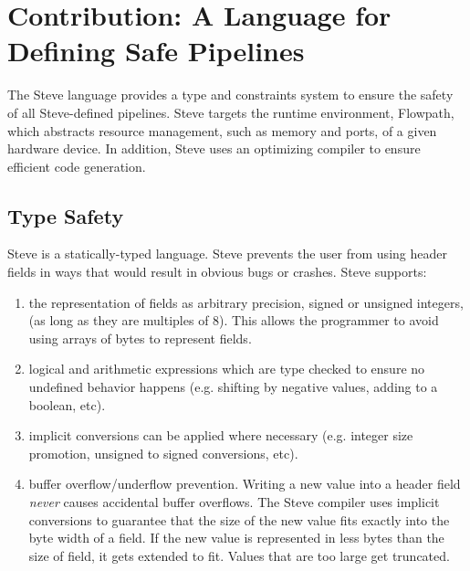\section{Contribution: A Language for Defining Safe Pipelines}

The Steve language provides a type and constraints system to ensure the safety
of all Steve-defined pipelines.
Steve targets the runtime environment, Flowpath, which abstracts resource management,
such as memory and ports, of a given hardware device.
In addition, Steve uses an optimizing compiler to ensure efficient code generation.

\subsection{Type Safety}

Steve is a statically-typed language. Steve prevents the user from using header
fields in ways that would result in obvious bugs or crashes. Steve supports:

\begin{enumerate}
\item the representation of fields as
arbitrary precision, signed or unsigned integers, (as long as they
are multiples of 8). This allows the programmer to avoid using arrays of bytes
to represent fields.

\item logical and arithmetic expressions which are type checked
to ensure no undefined behavior happens (e.g. shifting by negative values,
adding to a boolean, etc).

\item implicit conversions can be applied where necessary (e.g. integer size
promotion, unsigned to signed conversions, etc).

\item buffer overflow/underflow prevention. 
Writing a new value into a header field \textit{never} causes accidental
buffer overflows. The Steve compiler uses implicit conversions to guarantee that
the size of the new value fits exactly into the byte width of a field. If the
new value is represented in less bytes than the size of field, it gets extended
to fit. Values that are too large get truncated.
\end{enumerate}


